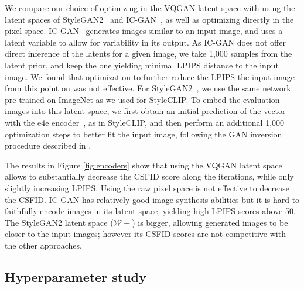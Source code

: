 We compare our choice of optimizing in the VQGAN latent space with using the latent
 spaces of StyleGAN2~\cite{karras20cvpr} and IC-GAN~\cite{casanova21nips}, as well as 
 optimizing directly in the pixel space.
IC-GAN~\cite{casanova21nips}  generates images similar to an input image, 
and uses  a latent variable to allow for variability in its output.
As IC-GAN does not offer direct  inference of the latents  for a given image, we take 
1,000 samples from the latent prior, and keep the one yielding minimal LPIPS distance 
to the input image. 
We found that  optimization to further reduce the LPIPS  \wrt the input image from this
 point on was not effective.
%
For StyleGAN2~\cite{karras20cvpr}, we use the same  network  pre-trained on ImageNet 
as we used for StyleCLIP.
To embed the evaluation images into this latent space, we first obtain an initial 
prediction of the vector with the e4e encoder~\cite{tov2021designing}, as in StyleCLIP, 
and then  perform an additional 1,000  optimization steps to better fit the input 
image, following the GAN inversion procedure described in \cite{karras19cvpr}.

The results in Figure \ref{fig:encoders} show that using the VQGAN latent space allows 
to substantially decrease the  CSFID score along the iterations, while only slightly 
increasing LPIPS. 
Using the raw pixel space is not effective to decrease the CSFID. 
IC-GAN has relatively good image synthesis abilities but it is hard to faithfully
 encode images in its latent space, yielding high LPIPS scores above 50. 
The StyleGAN2 latent space ($\mathcal{W+}$) is bigger, allowing generated images to 
be closer to the input images; however its CSFID scores are not competitive with the 
other approaches.

\subsection{Hyperparameter study\label{hparam}}





